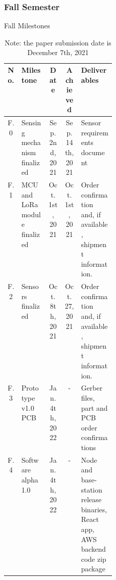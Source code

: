 \subsubsection{Fall Semester} 

\begin{table}[H] 
  \footnotesize  
  \caption{Fall Milestones}
  \begin{tabularx}{\linewidth}{| c | p{0.25\linewidth} | c | c | X |}
    \hline
    No. & Milestone & Date & Achieved & Deliverables 
    \\\hline\hline

    F.0 
    & Sensing mechanism finalized 
    & Sep. 2nd, 2021 
    & Sep. 14th, 2021
    & Sensor requirements document 
    \\\hline

    F.1 
    & MCU and LoRa module finalized
    & Oct. 1st, 2021 
    & Oct. 1st, 2021 
    & Order confirmation and, if available, shipment information. 
    \\\hline

    F.2 
    & Sensors finalized 
    & Oct. 8th, 2021 
    & Oct. 27, 2021
    & Order confirmation and, if available, shipment information. 
    \\\hline

    F.3 
    & Prototype v1.0 PCB 
    & Jan. 4th, 2022 
    & -
    & Gerber files, part and PCB order confirmations
    \\\hline

    F.4 
    & Software alpha 1.0 
    & Jan. 4th, 2022 
    & -
    & Node and base-station release binaries, React app, AWS backend code zip package 
    \\\hline

  \end{tabularx}
  \caption*{\footnotesize Note: the paper submission date is December 7th, 2021}
  \label{tab:fall-milestones}
\end{table}

